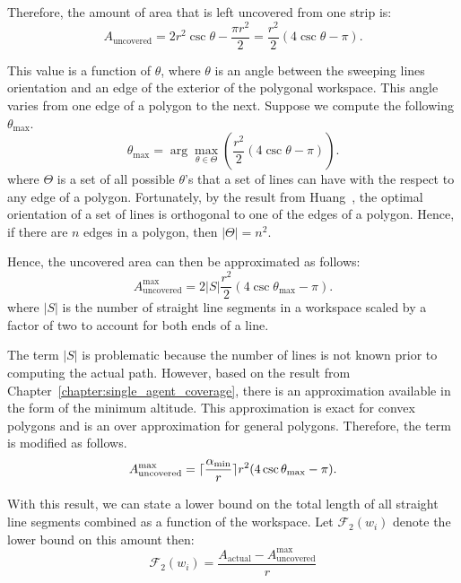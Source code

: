 \documentclass[../main.tex]{subfiles}
\begin{document}
Therefore, the amount of area that is left uncovered from one strip is:
\begin{equation}
	A_{\text{uncovered}}=2r^2\csc\theta-\frac{\pi r^2}{2}=\frac{r^2}{2}(4\csc\theta-\pi).
\end{equation}

This value is a function of $\theta$, where $\theta$ is an angle between the sweeping lines orientation and an edge of the exterior of the polygonal workspace. This angle varies from one edge of a polygon to the next. Suppose we compute the following $\theta_{\max}$.
\begin{equation}
	\theta_{\max}=\arg\max_{\theta\in\Theta}(\frac{r^2}{2}(4\csc\theta-\pi)).
\end{equation}%
where $\Theta$ is a set of all possible $\theta$'s that a set of lines can have with the respect to any edge of a polygon. Fortunately, by the result from Huang~\cite{Huang2001optimal}, the optimal orientation of a set of lines is orthogonal to one of the edges of a polygon. Hence, if there are $n$ edges in a polygon, then $|\Theta|=n^2$.

Hence, the uncovered area can then be approximated as follows:
\begin{equation}
	A_{\text{uncovered}}^{\max}=2|S|\frac{r^2}{2}(4\csc\theta_{\max}-\pi).
\end{equation}%
where $|S|$ is the number of straight line segments in a workspace scaled by a factor of two to account for both ends of a line.

The term $|S|$ is problematic because the number of lines is not known prior to computing the actual path. However, based on the result from Chapter~\ref{chapter:single_agent_coverage}, there is an approximation available in the form of the minimum altitude. This approximation is exact for convex polygons and is an over approximation for general polygons. Therefore, the term is modified as follows.
\begin{equation}
	A_{\text{uncovered}}^{\max}=\lceil\frac{\alpha_{\min}}{r}\rceil r^2(4\csc\theta_{\max}-\pi).
\end{equation}%



With this result, we can state a lower bound on the total length of all straight line segments combined as a function of the workspace. Let $\mathcal{F}_2(w_i)$ denote the lower bound on this amount then:
\begin{equation}
	\mathcal{F}_2(w_i)=\frac{A_{\text{actual}}-A_{\text{uncovered}}^{\max}}{r}
\end{equation}
\end{document}
